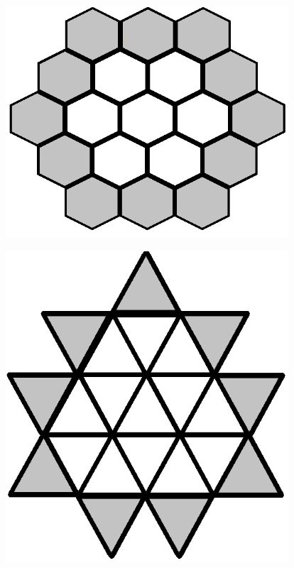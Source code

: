 \documentclass{article}
\newenvironment{Figure}
  {\par\medskip\noindent\minipage{\linewidth}}
  {\endminipage\par\medskip}
\begin{document}
\begin{multicols}{2}
\begin{Figure}
\label{fig:extcartesianstd}
\end{Figure}
\begin{Figure}
 \centering
 \includegraphics[width=0.79\textwidth]{imgs/extendedhexagonal.png}
\label{fig:exthexstd}
\end{Figure}
\begin{Figure}
 \centering
 \includegraphics[width=0.79\textwidth]{imgs/extendedtriangle1.png}
\label{fig:exttriangle1std}
\end{Figure}
\begin{Figure}

\end{Figure}
\end{multicols}
\end{document}
